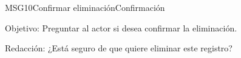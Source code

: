 \begin{mensaje}{MSG10}{Confirmar eliminación}{Confirmación}
	\item [Objetivo:] Preguntar al actor si desea confirmar la eliminación.
	\item[Redacción:] ¿Está seguro de que quiere eliminar este registro?
\end{mensaje}